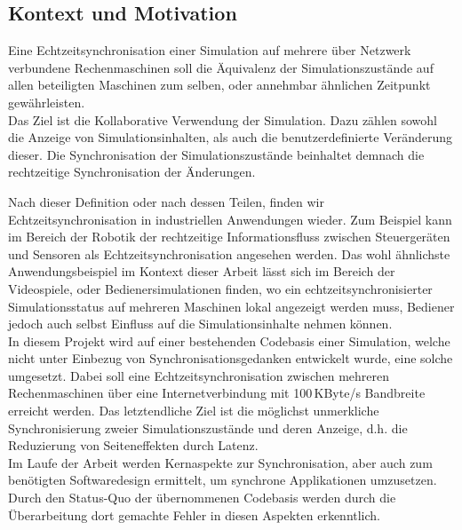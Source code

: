 

\subsection{Kontext und Motivation}
Eine Echtzeitsynchronisation einer Simulation auf mehrere über Netzwerk verbundene Rechenmaschinen soll die Äquivalenz der Simulationszustände auf allen beteiligten Maschinen zum selben, oder annehmbar ähnlichen Zeitpunkt gewährleisten.\\
Das Ziel ist die Kollaborative Verwendung der Simulation. 
Dazu zählen sowohl die Anzeige von Simulationsinhalten, als auch
die benutzerdefinierte Veränderung dieser. 
Die Synchronisation der Simulationszustände beinhaltet demnach die rechtzeitige Synchronisation der Änderungen.

Nach dieser Definition oder nach dessen Teilen, finden wir Echtzeitsynchronisation in industriellen Anwendungen wieder. Zum Beispiel kann im Bereich der Robotik der rechtzeitige Informationsfluss zwischen Steuergeräten und Sensoren als Echtzeitsynchronisation angesehen werden.
Das wohl ähnlichste Anwendungsbeispiel im Kontext dieser Arbeit lässt sich im Bereich der Videospiele, oder Bedienersimulationen finden, wo ein echtzeitsynchronisierter Simulationsstatus auf mehreren Maschinen lokal angezeigt werden muss, Bediener jedoch auch selbst Einfluss auf die Simulationsinhalte nehmen können.\\
In diesem Projekt wird auf einer bestehenden Codebasis einer Simulation, welche nicht unter Einbezug von Synchronisationsgedanken entwickelt wurde, eine solche umgesetzt. Dabei soll eine Echtzeitsynchronisation zwischen mehreren Rechenmaschinen über eine Internetverbindung mit 100\,KByte/s Bandbreite erreicht werden.
Das letztendliche Ziel ist die möglichst unmerkliche Synchronisierung zweier Simulationszustände und deren Anzeige, d.h. die Reduzierung von Seiteneffekten durch Latenz.\\
Im Laufe der Arbeit werden Kernaspekte zur Synchronisation, aber auch zum benötigten Softwaredesign ermittelt, um synchrone Applikationen umzusetzen. Durch den Status-Quo der übernommenen Codebasis werden durch die Überarbeitung dort gemachte Fehler in diesen Aspekten erkenntlich.

